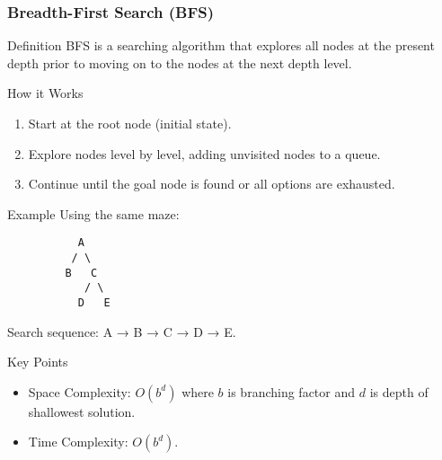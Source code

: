 \documentclass[aspectratio=169]{beamer}
\begin{document}
\begin{frame}
    \frametitle{Breadth-First Search (BFS)}
    \begin{block}{Definition}
        BFS is a searching algorithm that explores all nodes at the present depth prior to moving on to the nodes at the next depth level.
    \end{block}

    \begin{block}{How it Works}
        \begin{enumerate}
            \item Start at the root node (initial state).
            \item Explore nodes level by level, adding unvisited nodes to a queue.
            \item Continue until the goal node is found or all options are exhausted.
        \end{enumerate}
    \end{block}

    \begin{block}{Example}
        Using the same maze:
        \begin{verbatim}
           A
          / \
         B   C
            / \
           D   E
        \end{verbatim}
        Search sequence: A → B → C → D → E.
    \end{block}

    \begin{block}{Key Points}
        \begin{itemize}
            \item Space Complexity: $O(b^d)$ where $b$ is branching factor and $d$ is depth of shallowest solution.
            \item Time Complexity: $O(b^d)$.
        \end{itemize}
    \end{block}
\end{frame}
\end{document}
